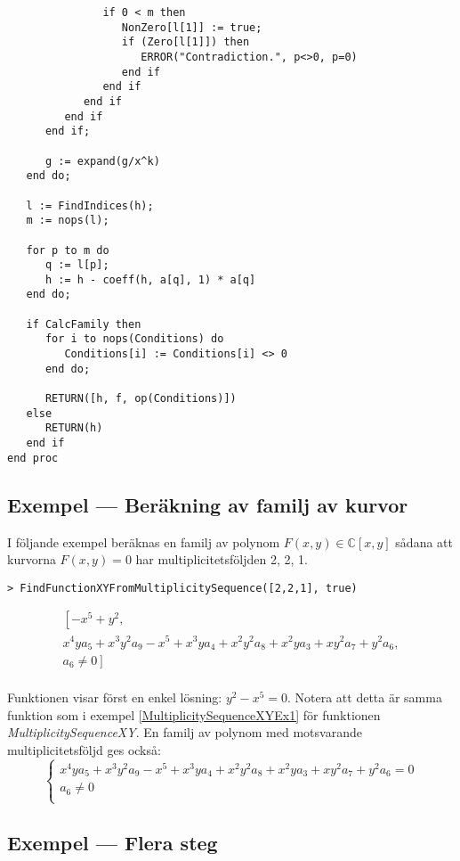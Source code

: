 \begin{verbatim}
               if 0 < m then
                  NonZero[l[1]] := true;
                  if (Zero[l[1]]) then
                     ERROR("Contradiction.", p<>0, p=0)
                  end if
               end if
            end if
         end if
      end if;

      g := expand(g/x^k)
   end do;

   l := FindIndices(h);
   m := nops(l);

   for p to m do
      q := l[p];
      h := h - coeff(h, a[q], 1) * a[q]
   end do;

   if CalcFamily then
      for i to nops(Conditions) do
         Conditions[i] := Conditions[i] <> 0
      end do;

      RETURN([h, f, op(Conditions)])
   else
      RETURN(h)
   end if
end proc
\end{verbatim}

\subsection{Exempel --- Beräkning av familj av kurvor}

I följande exempel beräknas en familj av polynom $F(x, y) \in \mathbb{C}[x, y]$ sådana att kurvorna $F(x, y) = 0$ har multiplicitetsföljden 2, 2, 1.

\begin{verbatim}
> FindFunctionXYFromMultiplicitySequence([2,2,1], true)
\end{verbatim}
\[
\begin{array}{l}
\left[-x^5+y^2,\right.\\
x^4ya_5+x^3y^2a_9-x^5+x^3ya_4+x^2y^2a_8+x^2ya_3+xy^2a_7+y^2a_6,\\
\left.a_6 \neq 0\right]\\
\end{array}
\]

Funktionen visar först en enkel lösning: $y^2 - x^5 = 0$. Notera att detta är samma funktion som i exempel \ref{MultiplicitySequenceXYEx1} för funktionen \emph{MultiplicitySequenceXY}. En familj av polynom med motsvarande multiplicitetsföljd ges också:
\[
\left\{
\begin{array}{l}
x^4ya_5+x^3y^2a_9-x^5+x^3ya_4+x^2y^2a_8+x^2ya_3+xy^2a_7+y^2a_6=0\\
a_6 \neq 0\\ 
\end{array}
\right.
\]

\subsection{Exempel --- Flera steg}

